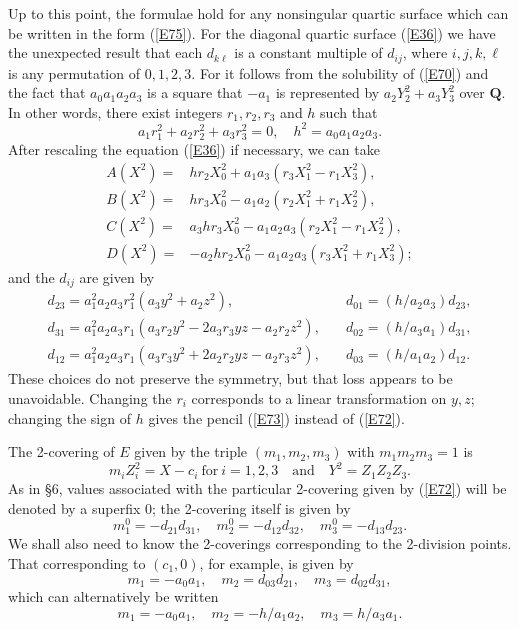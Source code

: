 \documentclass[12pt]{article}
\def\bQ{{\mathbf Q}}
\def\beq{\begin{equation} \label}
\begin{document}
Up to this point, the formulae hold for any nonsingular
quartic surface which can be written in the form (\ref{E75}).
For the diagonal quartic surface (\ref{E36}) we have the
unexpected result that each $d_{k\ell}$ is a constant multiple
of $d_{ij}$, where $i,j,k,\ell$ is any permutation of
$0,1,2,3$. For it follows from the solubility of (\ref{E70})
and the fact that $a_0a_1a_2a_3$ is a square that $-a_1$ is
represented by $a_2Y_2^2+a_3Y_3^2$ over $\bQ$. In other words,
there exist integers $r_1,r_2,r_3$ and $h$ such that
\[ a_1r_1^2+a_2r_2^2+a_3r_3^2=0, \quad h^2=a_0a_1a_2a_3. \]
After rescaling the equation (\ref{E36}) if necessary, we
can take
\begin{align*}
A(X^2)= & h r_2X_0^2+a_1a_3(r_3X_1^2-r_1X_3^2), \\
B(X^2)= & h r_3X_0^2-a_1a_2(r_2X_1^2+r_1X_2^2), \\
C(X^2)= & a_3hr_3X_0^2-a_1a_2a_3(r_2X_1^2-r_1X_2^2), \\
D(X^2)= & -a_2hr_2X_0^2-a_1a_2a_3(r_3X_1^2+r_1X_3^2);
\end{align*}
and the $d_{ij}$ are given by
\begin{align*}
d_{23}=a_1^2a_2a_3r_1^2(a_3y^2+a_2z^2), & \quad
d_{01}=(h/a_2a_3)d_{23}, \\
d_{31}=a_1^2a_2a_3r_1(a_3r_2y^2-2a_3r_3yz-a_2r_2z^2), & \quad
d_{02}=(h/a_3a_1)d_{31}, \\
d_{12}=a_1^2a_2a_3r_1(a_3r_3y^2+2a_2r_2yz-a_2r_3z^2), & \quad
d_{03}=(h/a_1a_2)d_{12}.
\end{align*}
These choices do not preserve the symmetry, but that loss
appears to be unavoidable.
Changing the $r_i$ corresponds to a linear
transformation on $y,z$; changing the sign of $h$ gives the
pencil (\ref{E73}) instead of (\ref{E72}).

The 2-covering of $E$ given by the triple $(m_1,m_2,m_3)$
with $m_1m_2m_3=1$ is
\[ m_iZ_i^2=X-c_i \mathrm{~for~} i=1,2,3 \quad \mathrm{and}
\quad Y^2=Z_1Z_2Z_3. \]
As in \S6, values associated with the particular
2-covering given by (\ref{E72}) will be denoted by a superfix
0; the 2-covering itself is given by
\[ m_1^0=-d_{21}d_{31}, \quad m_2^0=-d_{12}d_{32}, \quad
m_3^0=-d_{13}d_{23}. \]
We shall also need to know the 2-coverings corresponding to
the 2-division points. That corresponding to
$(c_1,0)$, for example, is given by
\beq{E81} m_1=-a_0a_1, \quad m_2=d_{03}d_{21},
\quad m_3=d_{02}d_{31}, \end{equation}
which can alternatively be written
\[ m_1=-a_0a_1, \quad m_2=-h/a_1a_2, \quad
m_3=h/a_3a_1. \]
\end{document}
